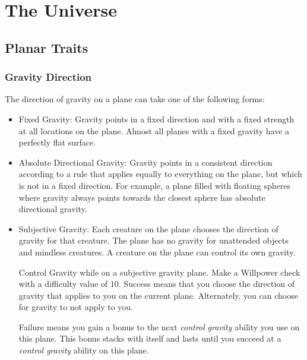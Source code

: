\chapter{The Universe}

\section{Planar Traits}
  \subsection{Gravity Direction}
    The direction of gravity on a plane can take one of the following forms:
    \begin{itemize}
      \item Fixed Gravity: Gravity points in a fixed direction and with a fixed strength at all locations on the plane.
        Almost all planes with a fixed gravity have a perfectly flat surface.
      \item Absolute Directional Gravity: Gravity points in a consistent direction according to a rule that applies equally to everything on the plane, but which is not in a fixed direction.
        For example, a plane filled with floating spheres where gravity always points towards the closest sphere has absolute directional gravity.
      \item Subjective Gravity: Each creature on the plane chooses the direction of gravity for that creature.
        The plane has no gravity for unattended objects and mindless creatures.
        A creature on the plane can control its own gravity.
        \begin{activeability}{Control Gravity}
          \abilityusagetime {} while on a subjective gravity plane.
          \rankline
          Make a Willpower check with a difficulty value of 10.
          Success means that you choose the direction of gravity that applies to you on the current plane.
          Alternately, you can choose for gravity to not apply to you.

          Failure means you gain a  bonus to the next \textit{control gravity} ability you use on this plane.
          This bonus stacks with itself and lasts until you succeed at a \textit{control gravity} ability on this plane.
        \end{activeability}
    \end{itemize}

